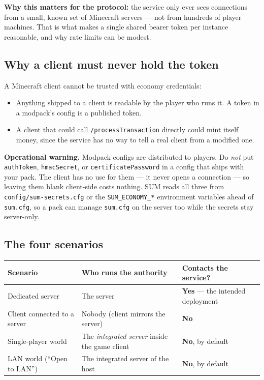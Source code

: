 \documentclass[11pt,a4paper]{article}
\newcommand{\code}[1]{\texttt{\small #1}}
\newcommand{\keybox}[2]{%
  \par\vspace{0.5em}\noindent
  \colorbox{#1}{%
    \begin{minipage}{\dimexpr\linewidth-2\fboxsep\relax}
    \vspace{0.35em}\small #2\vspace{0.35em}
    \end{minipage}}%
  \par\vspace{0.5em}}
\newcommand{\note}[1]{\keybox{omceWash}{#1}}
\newcommand{\warn}[1]{\keybox{omceWarnWash}{#1}}
\begin{document}
\note{\textbf{Why this matters for the protocol:} the service only ever sees connections from a
small, known set of Minecraft servers --- not from hundreds of player machines. That is what makes
a single shared bearer token per instance reasonable, and why rate limits can be modest.}

\subsection{Why a client must never hold the token}
\label{sec:notoken}

A Minecraft client cannot be trusted with economy credentials:

\begin{itemize}
\item Anything shipped to a client is readable by the player who runs it. A token in a modpack's
      config is a published token.
\item A client that could call \code{/processTransaction} directly could mint itself money, since
      the service has no way to tell a real client from a modified one.
\end{itemize}

\warn{\textbf{Operational warning.} Modpack configs are distributed to players. Do \emph{not} put
\code{authToken}, \code{hmacSecret}, or \code{certificatePassword} in a config that ships with your
pack. The client has no use for them --- it never opens a connection --- so leaving them blank
client-side costs nothing. SUM reads all three from \code{config/sum-secrets.cfg} or the
\code{SUM\_ECONOMY\_*} environment variables ahead of \code{sum.cfg}, so a pack can manage
\code{sum.cfg} on the server too while the secrets stay server-only.}

\subsection{The four scenarios}

\begin{tabularx}{\linewidth}{L{5.4cm} L{5.0cm} X}
\toprule
\textbf{Scenario} & \textbf{Who runs the authority} & \textbf{Contacts the service?}\\
\midrule
Dedicated server                    & The server                        & \textbf{Yes} --- the intended deployment\\
Client connected to a server        & Nobody (client mirrors the server) & \textbf{No}\\
Single-player world                 & The \emph{integrated server} inside the game client & \textbf{No}, by default\\
LAN world (``Open to LAN'')         & The integrated server of the host  & \textbf{No}, by default\\
\bottomrule
\end{tabularx}
\end{document}
